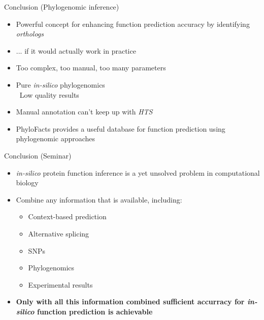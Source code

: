 \documentclass[14pt,xcolor=dvipsnames,pdftex]{beamer}
\begin{document}
\begin{frame}{Conclusion (Phylogenomic inference)}
 \begin{itemize}
  \item Powerful concept for enhancing function prediction accuracy by identifying \textit{orthologs}
  \pause
  \item ... if it would actually work in practice
  \item Too complex, too manual, too many parameters
  \item Pure \textit{in-silico} phylogenomics\\
  \textrightarrow\ Low quality results
  \item Manual annotation can't keep up with \textit{HTS}
  \item PhyloFacts provides a useful database for function prediction using phylogenomic approaches
 \end{itemize}
\end{frame}

\begin{frame}{Conclusion (Seminar)}
\begin{itemize}
\item \textit{in-silico} protein function inference is a yet unsolved problem in computational biology
\item Combine any information that is available, including:
\begin{itemize}
 \item Context-based prediction
 \item Alternative splicing
 \item SNPs
 \item Phylogenomics
 \item Experimental results
\end{itemize}
\item \textbf{Only with all this information combined sufficient accurracy for \textit{in-silico} function prediction is achievable}
\end{itemize}
\end{frame}
\end{document}
